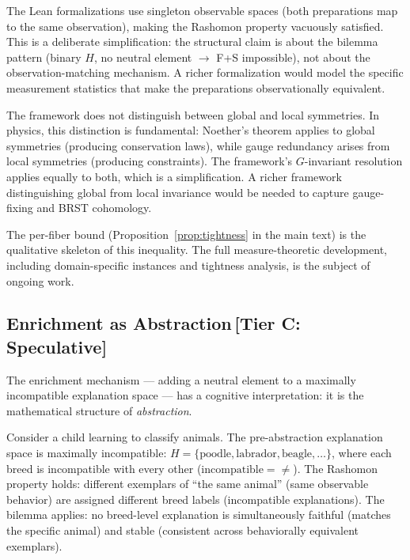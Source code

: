 \documentclass[11pt,a4paper]{article}
\begin{document}
The Lean formalizations use singleton observable spaces (both preparations map to the same observation), making the Rashomon property vacuously satisfied.  This is a deliberate simplification: the structural claim is about the bilemma pattern (binary $H$, no neutral element $\to$ F+S impossible), not about the observation-matching mechanism.  A richer formalization would model the specific measurement statistics that make the preparations observationally equivalent.

The framework does not distinguish between global and local symmetries.  In physics, this distinction is fundamental: Noether's theorem applies to global symmetries (producing conservation laws), while gauge redundancy arises from local symmetries (producing constraints).  The framework's $G$-invariant resolution applies equally to both, which is a simplification.  A richer framework distinguishing global from local invariance would be needed to capture gauge-fixing and BRST cohomology.



The per-fiber bound (Proposition~\ref{prop:tightness} in the main text) is the qualitative skeleton of this inequality. The full measure-theoretic development, including domain-specific instances and tightness analysis, is the subject of ongoing work.

\subsection{Enrichment as Abstraction\,\textnormal{\normalsize[Tier C: Speculative]}}
\label{sec:enrichment-abstraction}

The enrichment mechanism --- adding a neutral element to a maximally
incompatible explanation space --- has a cognitive interpretation: it is
the mathematical structure of \emph{abstraction}.

Consider a child learning to classify animals. The pre-abstraction
explanation space is maximally incompatible: $H = \{\text{poodle},
\text{labrador}, \text{beagle}, \ldots\}$, where each breed is
incompatible with every other ($\text{incompatible} = {\neq}$).  The
Rashomon property holds: different exemplars of ``the same animal''
(same observable behavior) are assigned different breed labels
(incompatible explanations).  The bilemma applies: no breed-level
explanation is simultaneously faithful (matches the specific animal) and
stable (consistent across behaviorally equivalent exemplars).
\end{document}
